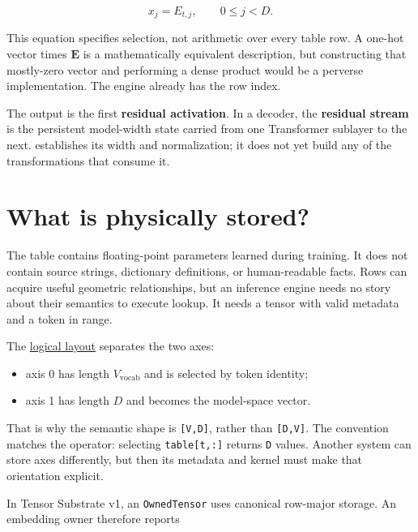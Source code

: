\begin{equation}
x_j=E_{t,j},
\qquad 0\le j<D.
\end{equation}

This equation specifies selection, not arithmetic over every table row.
A one-hot vector times \(\mathbf{E}\) is a mathematically equivalent
description, but constructing that mostly-zero vector and performing a
dense product would be a perverse implementation. The engine already has
the row index.

The output is the first \textbf{residual activation}. In a decoder, the
\textbf{residual stream} is the persistent model-width state carried
from one Transformer sublayer to the next.  establishes its
width and normalization; it does not yet build any of the
transformations that consume it.

\section{What is physically stored?}\label{what-is-physically-stored}

The table contains floating-point parameters learned during training. It
does not contain source strings, dictionary definitions, or
human-readable facts. Rows can acquire useful geometric relationships,
but an inference engine needs no story about their semantics to execute
lookup. It needs a tensor with valid metadata and a token in range.

The
\href{https://github.com/hermonai/inside-the-llm-engine/blob/astra-visual-rewrite/diagrams/transformer/embedding-logical-layout.txt}{logical
layout} separates the two axes:

\begin{itemize}
\tightlist
\item
  axis 0 has length \(V_{\mathrm{vocab}}\) and is selected by token
  identity;
\item
  axis 1 has length \(D\) and becomes the model-space vector.
\end{itemize}

That is why the semantic shape is \texttt{{[}V,D{]}}, rather than
\texttt{{[}D,V{]}}. The convention matches the operator: selecting
\texttt{table{[}t,:{]}} returns \texttt{D} values. Another system can
store axes differently, but then its metadata and kernel must make that
orientation explicit.

In Tensor Substrate v1, an \texttt{OwnedTensor} uses canonical row-major
storage. An embedding owner therefore reports

